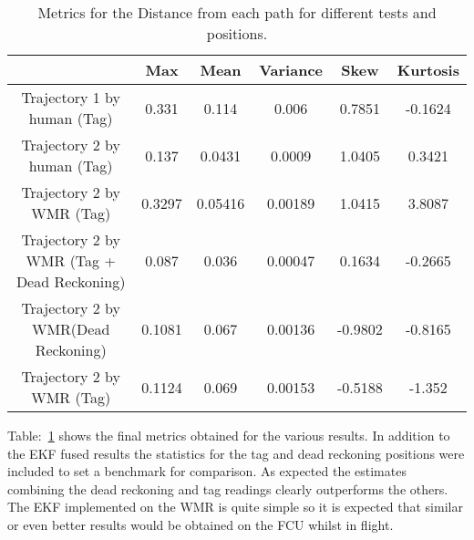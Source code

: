 \begin{table}[ht!]
    \centering
    \begin{tabular}{|c|c|c|c|c|c|}
        \hline
        & Max & Mean & Variance & Skew & Kurtosis \\
        \hline
        Trajectory 1 by human (Tag) & 0.331 & 0.114 & 0.006 & 0.7851 & -0.1624\\
        \hline
        Trajectory 2 by human (Tag) & 0.137 & 0.0431& 0.0009 & 1.0405 & 0.3421\\
        \hline
        Trajectory 2 by WMR (Tag) &  0.3297 & 0.05416 & 0.00189 & 1.0415 & 3.8087\\
        \hline
        \rowcolor{LightGreen}Trajectory 2 by WMR (Tag + Dead Reckoning)& 0.087 & 0.036 & 0.00047 & 0.1634 & -0.2665\\
        \hline
        Trajectory 2 by WMR(Dead Reckoning)& 0.1081 & 0.067 & 0.00136 & -0.9802 & -0.8165\\
        \hline
        Trajectory 2 by WMR (Tag) & 0.1124 & 0.069 & 0.00153 & -0.5188 & -1.352\\
        \hline
    \end{tabular}
    \caption{Metrics for the Distance from each path for different tests and positions.}
    \label{tb:results}
\end{table}

Table:~\ref{tb:results} shows the final metrics obtained for the various results.
In addition to the EKF fused results the statistics for the tag and dead reckoning positions were included to set a benchmark for comparison.
As expected the estimates combining the dead reckoning and tag readings clearly outperforms the others.
The EKF implemented on the WMR is quite simple so it is expected that similar or even better results would be obtained on the FCU whilst in flight.